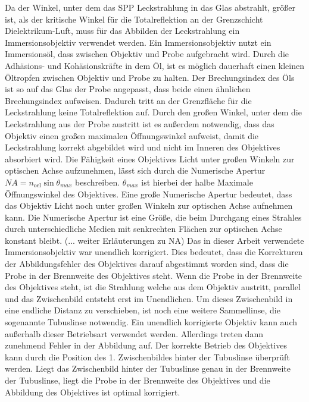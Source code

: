 \documentclass[titlepage]{article}
\begin{document}
	Da der Winkel, unter dem das SPP Leckstrahlung in das Glas abstrahlt, größer ist, als der kritische Winkel für die Totalreflektion an der Grenzschicht Dielektrikum-Luft, muss für das Abbilden der Leckstrahlung ein Immersionsobjektiv verwendet werden. Ein Immersionsobjektiv nutzt ein Immersionsöl, dass zwischen Objektiv und Probe aufgebracht wird. Durch die Adhäsions- und Kohäsionskräfte in dem Öl, ist es möglich dauerhaft einen kleinen Öltropfen zwischen Objektiv und Probe zu halten. Der Brechungsindex des Öls ist so auf das Glas der Probe angepasst, dass beide einen ähnlichen Brechungsindex aufweisen. Dadurch tritt an der Grenzfläche für die Leckstrahlung keine Totalreflektion auf. Durch den großen Winkel, unter dem die Leckstrahlung aus der Probe austritt ist es außerdem notwendig, dass das Objektiv einen großen maximalen Öffnungswinkel aufweist, damit die Leckstrahlung korrekt abgebildet wird und nicht im Inneren des Objektives absorbiert wird. Die Fähigkeit eines Objektives Licht unter großen Winkeln zur optischen Achse aufzunehmen, lässt sich durch die Numerische Apertur $NA = n_{\mathrm{oel}}\sin\theta_{max}$ beschreiben. $\theta_{max}$ ist hierbei der halbe Maximale Öffnungswinkel des Objektives. Eine große Numerische Apertur bedeutet, dass das Objektiv Licht noch unter großen Winkeln zur optischen Achse aufnehmen kann. Die Numerische Apertur ist eine Größe, die beim Durchgang eines Strahles durch unterschiedliche Medien mit senkrechten Flächen zur optischen Achse konstant bleibt. (... weiter Erläuterungen zu NA) Das in dieser Arbeit verwendete Immersionsobjektiv war unendlich korrigiert. Dies bedeutet, dass die Korrekturen der Abbildungsfehler des Objektives darauf abgestimmt worden sind, dass die Probe in der Brennweite des Objektives steht. Wenn die Probe in der Brennweite des Objektives steht, ist die Strahlung welche aus dem Objektiv austritt, parallel und das Zwischenbild entsteht erst im Unendlichen. Um dieses Zwischenbild in eine endliche Distanz zu verschieben, ist noch eine weitere Sammellinse, die sogenannte Tubuslinse notwendig. Ein unendlich korrigierte Objektiv kann auch außerhalb dieser Betriebsart verwendet werden. Allerdings treten dann zunehmend Fehler in der Abbildung auf. Der korrekte Betrieb des Objektives kann durch die Position des  1. Zwischenbildes hinter der Tubuslinse überprüft werden. Liegt das Zwischenbild hinter der Tubuslinse genau in der Brennweite der Tubuslinse, liegt die Probe in der Brennweite des Objektives und die Abbildung des Objektives ist optimal korrigiert.\cite{Kuhl.2018}
\end{document}
